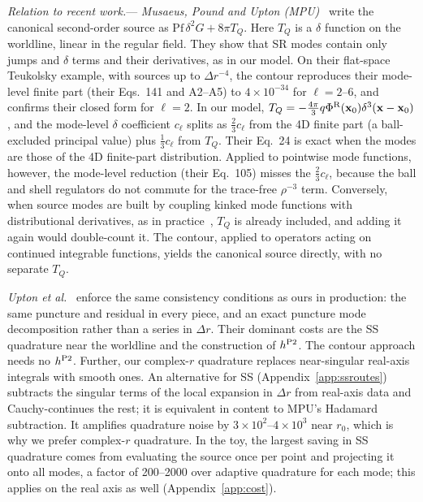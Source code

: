 \documentclass[aps,prl,twocolumn,superscriptaddress,nofootinbib,floatfix]{revtex4-2}
\newcommand{\PhiR}{\Phi^{\rm R}}
\newcommand{\x}{\mathbf{x}}
\begin{document}
\emph{Relation to recent work.}---%
\emph{Musaeus, Pound and Upton (MPU)}~\cite{MusaeusPoundUpton2026} write the canonical second-order source as $\mathrm{Pf}\,\delta^2G+8\pi T_Q$.
Here $T_Q$ is a $\delta$ function on the worldline, linear in the regular field.
They show that SR modes contain only jumps and $\delta$ terms and their derivatives, as in our model.
On their flat-space Teukolsky example, with sources up to $\Delta r^{-4}$, the contour reproduces their mode-level finite part (their Eqs.~141 and A2--A5) to $4\times10^{-34}$ for $\ell=2$--$6$, and confirms their closed form for $\ell=2$.
In our model, $T_Q=-\tfrac{4\pi}{3}q\PhiR(\x_0)\delta^3(\x-\x_0)$, and the mode-level $\delta$ coefficient $c_\ell$ splits as $\tfrac23c_\ell$ from the 4D finite part (a ball-excluded principal value) plus $\tfrac13c_\ell$ from $T_Q$.
Their Eq.~24 is exact when the modes are those of the 4D finite-part distribution.
Applied to pointwise mode functions, however, the mode-level reduction (their Eq.~105) misses the $\tfrac23c_\ell$, because the ball and shell regulators do not commute for the trace-free $\rho^{-3}$ term.
Conversely, when source modes are built by coupling kinked mode functions with distributional derivatives, as in practice~\cite{Upton2026}, $T_Q$ is already included, and adding it again would double-count it.
The contour, applied to operators acting on continued integrable functions, yields the canonical source directly, with no separate $T_Q$.

\emph{Upton et al.}~\cite{Upton2026} enforce the same consistency conditions as ours in production: the same puncture and residual in every piece, and an exact puncture mode decomposition rather than a series in $\Delta r$.
Their dominant costs are the SS quadrature near the worldline and the construction of $h^{\rm P2}$.
The contour approach needs no $h^{\rm P2}$.
Further, our complex-$r$ quadrature replaces near-singular real-axis integrals with smooth ones.
An alternative for SS (Appendix~\ref{app:ssroutes}) subtracts the singular terms of the local expansion in $\Delta r$ from real-axis data and Cauchy-continues the rest; it is equivalent in content to MPU's Hadamard subtraction.
It amplifies quadrature noise by $3\times10^2$--$4\times10^3$ near $r_0$, which is why we prefer complex-$r$ quadrature.
In the toy, the largest saving in SS quadrature comes from evaluating the source once per point and projecting it onto all modes, a factor of 200--2000 over adaptive quadrature for each mode; this applies on the real axis as well (Appendix~\ref{app:cost}).
\end{document}
